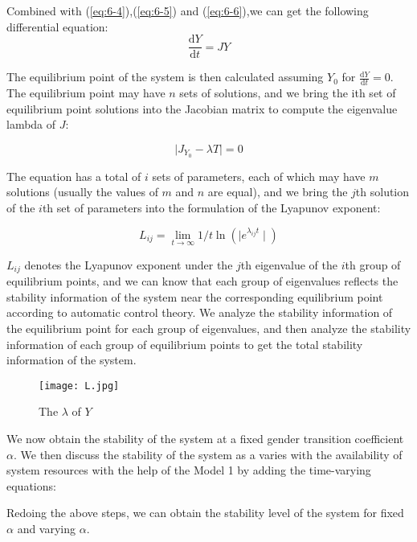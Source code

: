 \documentclass[12pt]{article}  %
\begin{document}
Combined with (\ref{eq:6-4}),(\ref{eq:6-5}) and (\ref{eq:6-6}),we can get the following differential equation:
\begin{equation}\label{eq:6-7}
\frac{\mathrm{d}Y}{\mathrm{d}t}=JY
\end{equation}

The equilibrium point of the system is then calculated assuming $Y_0$ for $\frac{\mathrm{d}Y}{\mathrm{d}t}=0$. The equilibrium point may have $n$ sets of solutions, and we bring the ith set of equilibrium point solutions into the Jacobian matrix to compute the eigenvalue lambda of $J$:

\begin{equation}\label{eq:6-9}
\mid J_{Y_0}-\lambda T\mid = 0
\end{equation}

The equation has a total of $i$ sets of parameters, each of which may have $m$ solutions (usually the values of $m$ and $n$ are equal), and we bring the $j$th solution of the $i$th set of parameters into the formulation of the Lyapunov exponent:

\begin{equation}\label{eq:6-10}
L_{ij}=\lim_{ t \to \infty } 1/t\ln(\mid e^{\lambda_{ij}t}\mid) 
\end{equation}

$L_{ij}$ denotes the Lyapunov exponent under the $j$th eigenvalue of the $i$th group of equilibrium points, and we can know that each group of eigenvalues reflects the stability information of the system near the corresponding equilibrium point according to automatic control theory. We analyze the stability information of the equilibrium point for each group of eigenvalues, and then analyze the stability information of each group of equilibrium points to get the total stability information of the system.
\begin{figure}[htbp]
	\centering
	\texttt{[image: L.jpg]}
	\caption{The $\lambda$ of $Y$}\label{fig:L}
\end{figure}

We now obtain the stability of the system at a fixed gender transition coefficient $\alpha$. We then discuss the stability of the system as a varies with the availability of system resources with the help of the Model 1 by adding the time-varying equations:

Redoing the above steps, we can obtain the stability level of the system for fixed $\alpha$ and varying $\alpha$.
\end{document}
